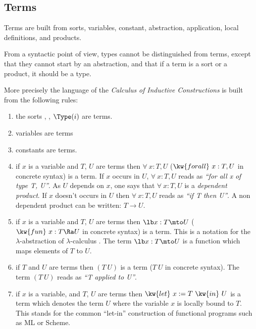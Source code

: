 \subsection{Terms}

Terms are built from sorts, variables, constant,
abstraction, application, local definitions,
and products.

From a syntactic point of view, types cannot be distinguished from terms,
except that they cannot start by an abstraction, and that if a term is
a sort or a product, it should be a type.

More precisely the language of the {\em Calculus of Inductive
  Constructions} is built from the following rules:

\begin{enumerate}
\item the sorts {\Set}, {\Prop}, ${\Type(i)}$ are terms.
\item variables are terms
\item constants are terms.
\item if $x$ is a variable and $T$, $U$ are terms then $\forall~x:T,U$
  ($\kw{forall}~x:T,U$ in \Coq{} concrete syntax) is a term. If $x$
  occurs in $U$, $\forall~x:T,U$ reads as {\it ``for all x of type T,
    U''}. As $U$ depends on $x$, one says that $\forall~x:T,U$ is a
  {\em dependent product}. If $x$ doesn't occurs in $U$ then
  $\forall~x:T,U$ reads as {\it ``if T then U''}. A non dependent
  product can be written: $T \rightarrow U$.
\item if $x$ is a variable and $T$, $U$ are terms then $\lb x:T \mto U$
  ($\kw{fun}~x:T\Ra U$ in \Coq{} concrete syntax) is a term. This is a
  notation for the $\lambda$-abstraction of
  $\lambda$-calculus
  \cite{Bar81}. The term $\lb x:T \mto U$ is a function which maps
  elements of $T$ to $U$.
\item if $T$ and $U$ are terms then $(T\ U)$ is a term  
 ($T~U$ in \Coq{} concrete syntax).  The term $(T\ 
  U)$ reads as {\it ``T applied to U''}.
\item if $x$ is a variable, and $T$, $U$ are terms then
  $\kw{let}~x:=T~\kw{in}~U$ is a
  term which denotes the term $U$ where the variable $x$ is locally
  bound to $T$. This stands for the common ``let-in'' construction of
  functional programs such as ML or Scheme.
\end{enumerate}

